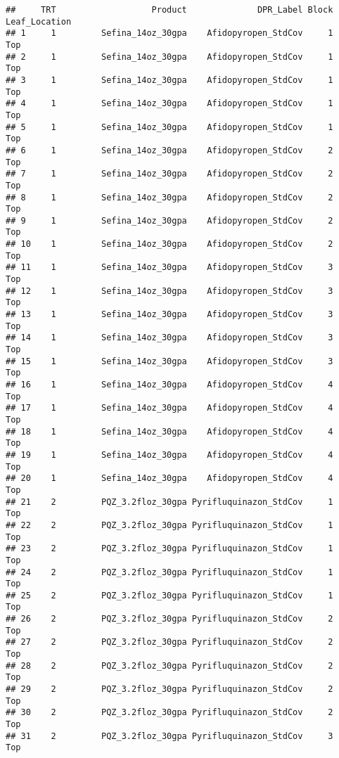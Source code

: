 \documentclass[
]{article}
\begin{document}
\begin{verbatim}
##     TRT                   Product              DPR_Label Block Leaf_Location
## 1     1         Sefina_14oz_30gpa    Afidopyropen_StdCov     1           Top
## 2     1         Sefina_14oz_30gpa    Afidopyropen_StdCov     1           Top
## 3     1         Sefina_14oz_30gpa    Afidopyropen_StdCov     1           Top
## 4     1         Sefina_14oz_30gpa    Afidopyropen_StdCov     1           Top
## 5     1         Sefina_14oz_30gpa    Afidopyropen_StdCov     1           Top
## 6     1         Sefina_14oz_30gpa    Afidopyropen_StdCov     2           Top
## 7     1         Sefina_14oz_30gpa    Afidopyropen_StdCov     2           Top
## 8     1         Sefina_14oz_30gpa    Afidopyropen_StdCov     2           Top
## 9     1         Sefina_14oz_30gpa    Afidopyropen_StdCov     2           Top
## 10    1         Sefina_14oz_30gpa    Afidopyropen_StdCov     2           Top
## 11    1         Sefina_14oz_30gpa    Afidopyropen_StdCov     3           Top
## 12    1         Sefina_14oz_30gpa    Afidopyropen_StdCov     3           Top
## 13    1         Sefina_14oz_30gpa    Afidopyropen_StdCov     3           Top
## 14    1         Sefina_14oz_30gpa    Afidopyropen_StdCov     3           Top
## 15    1         Sefina_14oz_30gpa    Afidopyropen_StdCov     3           Top
## 16    1         Sefina_14oz_30gpa    Afidopyropen_StdCov     4           Top
## 17    1         Sefina_14oz_30gpa    Afidopyropen_StdCov     4           Top
## 18    1         Sefina_14oz_30gpa    Afidopyropen_StdCov     4           Top
## 19    1         Sefina_14oz_30gpa    Afidopyropen_StdCov     4           Top
## 20    1         Sefina_14oz_30gpa    Afidopyropen_StdCov     4           Top
## 21    2         PQZ_3.2floz_30gpa Pyrifluquinazon_StdCov     1           Top
## 22    2         PQZ_3.2floz_30gpa Pyrifluquinazon_StdCov     1           Top
## 23    2         PQZ_3.2floz_30gpa Pyrifluquinazon_StdCov     1           Top
## 24    2         PQZ_3.2floz_30gpa Pyrifluquinazon_StdCov     1           Top
## 25    2         PQZ_3.2floz_30gpa Pyrifluquinazon_StdCov     1           Top
## 26    2         PQZ_3.2floz_30gpa Pyrifluquinazon_StdCov     2           Top
## 27    2         PQZ_3.2floz_30gpa Pyrifluquinazon_StdCov     2           Top
## 28    2         PQZ_3.2floz_30gpa Pyrifluquinazon_StdCov     2           Top
## 29    2         PQZ_3.2floz_30gpa Pyrifluquinazon_StdCov     2           Top
## 30    2         PQZ_3.2floz_30gpa Pyrifluquinazon_StdCov     2           Top
## 31    2         PQZ_3.2floz_30gpa Pyrifluquinazon_StdCov     3           Top

\end{verbatim}
\end{document}
